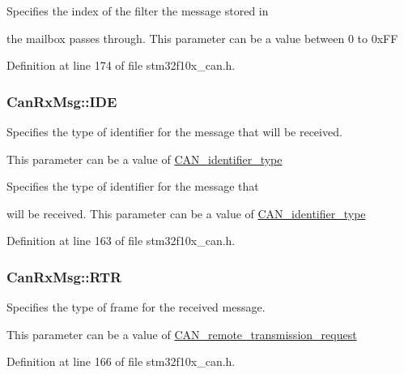 \begin{DoxyVerb}     Specifies the index of the filter the message stored in 
\end{DoxyVerb}
 the mailbox passes through. This parameter can be a value between 0 to 0x\-F\-F 

Definition at line 174 of file stm32f10x\-\_\-can.\-h.

\hypertarget{struct_can_rx_msg_a83a67d1a709cc01570ce956e5adc811f}{
\subsubsection[{I\-D\-E}]{ Can\-Rx\-Msg\-::\-I\-D\-E}}\label{struct_can_rx_msg_a83a67d1a709cc01570ce956e5adc811f}
\begin{DoxyVerb}     Specifies the type of identifier for the message that will be received.
\end{DoxyVerb}
 This parameter can be a value of \hyperlink{group___c_a_n__identifier__type}{C\-A\-N\-\_\-identifier\-\_\-type}

\begin{DoxyVerb}     Specifies the type of identifier for the message that 
\end{DoxyVerb}
 will be received. This parameter can be a value of \hyperlink{group___c_a_n__identifier__type}{C\-A\-N\-\_\-identifier\-\_\-type} 

Definition at line 163 of file stm32f10x\-\_\-can.\-h.

\hypertarget{struct_can_rx_msg_a9a183149a391a24f86da2ce895f0f1c9}{
\subsubsection[{R\-T\-R}]{ Can\-Rx\-Msg\-::\-R\-T\-R}}\label{struct_can_rx_msg_a9a183149a391a24f86da2ce895f0f1c9}
\begin{DoxyVerb}     Specifies the type of frame for the received message.
\end{DoxyVerb}
 This parameter can be a value of \hyperlink{group___c_a_n__remote__transmission__request}{C\-A\-N\-\_\-remote\-\_\-transmission\-\_\-request} 

Definition at line 166 of file stm32f10x\-\_\-can.\-h.

